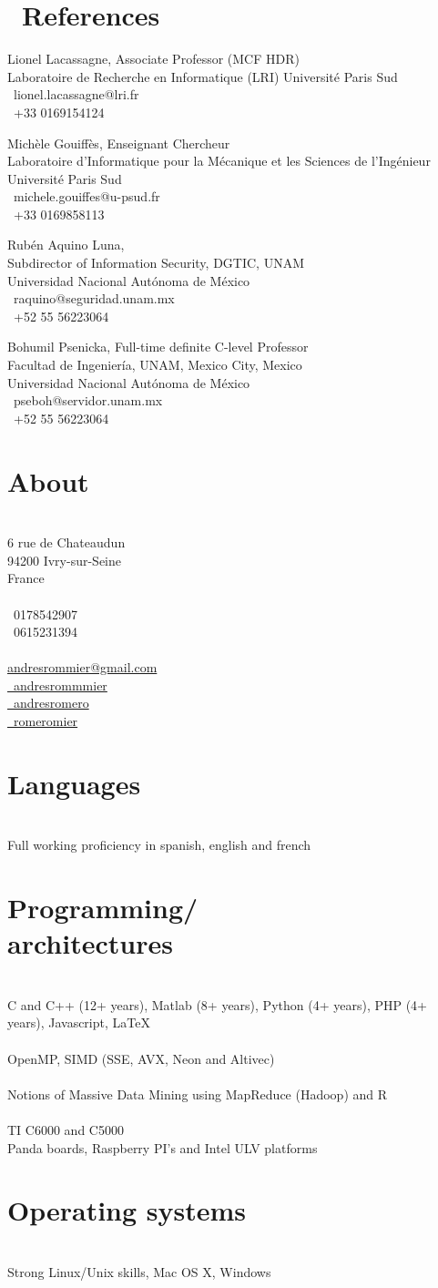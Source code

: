 \documentclass[]{friggeri-cv}
\makeatletter
\def\twitter{{\FA \faTwitter}}
\def\github{{\FA \faGithub}}
\def\linkedin{{\FA \faLinkedin}}
\def\envelope{{\FA \faEnvelopeAlt}}
\def\phone{{\FA \faPhone}}
\def\mobilePhone{{\FA \faMobilePhone}}
\def\quotesymbol{{\FA \faQuote}}
\newcommand{\printaside}{
  \begin{aside}
    \section{About}
      \\
      {6 rue de Chateaudun\\
        94200 Ivry-sur-Seine\\
        France\\
        ~\\
        \phone\ 0178542907\\
        \mobilePhone\ 0615231394\\
        ~\\
        \href{mailto:andresrommier@gmail.com}{\envelope andresrommier@gmail.com}\\
        \href{http://twitter.com/andresrommier}{\twitter\ andresrommmier}\\
        \href{http://andresromero.github.com}{\github\ andresromero}\\
        \href{https://www.linkedin.com/in/romeromier}{\linkedin\ romeromier}}\\
    \section{Languages}\\
      {Full working proficiency in spanish, english and french}\\
    \section{Programming/ \\ architectures}\\
      {C and C++ (12+ years), Matlab (8+ years), Python (4+ years), PHP (4+ years), Javascript, {\stdfont \LaTeX} }\\
      ~\\
      {OpenMP, SIMD (SSE, AVX, Neon and Altivec)}\\
      ~\\
      {Notions of Massive Data Mining using MapReduce (Hadoop) and R}\\
      ~\\
      {TI C6000 and C5000}\\
      {Panda boards, Raspberry PI's and Intel ULV platforms}\\
    \section{Operating systems}\\
      {Strong Linux/Unix skills, Mac OS X, Windows}\\
  \end{aside}
}
\makeatother
\begin{document}
\section{{\quotesymbol}\ References}
  Lionel Lacassagne, Associate Professor (MCF HDR) \\
  Laboratoire de Recherche en Informatique (LRI)
  Université Paris Sud\\
  \envelope\ lionel.lacassagne@lri.fr\\
  \phone\ +33 0169154124

  \dottedline

  Michèle Gouiffès, Enseignant Chercheur \\
  Laboratoire d'Informatique pour la Mécanique et les Sciences de l'Ingénieur \\
  Université Paris Sud\\
  \envelope\ michele.gouiffes@u-psud.fr\\
  \phone\ +33 0169858113

  \dottedline

  Rubén Aquino Luna,  \\
  Subdirector of Information Security, DGTIC, UNAM \\
  Universidad Nacional Autónoma de México \\
  \envelope\ raquino@seguridad.unam.mx\\
  \phone\ +52 55 56223064

  \dottedline

  Bohumil Psenicka, Full-time definite C-level Professor \\
  Facultad de Ingeniería, UNAM, Mexico City, Mexico \\
  Universidad Nacional Autónoma de México \\
  \envelope\ pseboh@servidor.unam.mx\\
  \phone\ +52 55 56223064

\printaside
\end{document}
